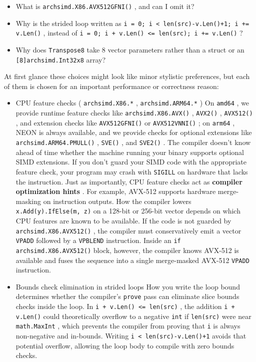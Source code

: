 \documentclass[11pt,a4paper]{article}
\begin{document}
\begin{itemize}
\item What is \texttt{archsimd.X86.AVX512GFNI()} , and can I omit it?
\item Why is the strided loop written as \texttt{i = 0; i < len(src)-v.Len()+1; i += v.Len()} , instead of \texttt{i = 0; i + v.Len() <= len(src); i += v.Len()} ?
\item Why does \texttt{Transpose8} take 8 vector parameters rather than a struct or an \texttt{[8]archsimd.Int32x8} array?
\end{itemize}

At first glance these choices might look like minor stylistic preferences, but each of them is chosen for an important performance or correctness reason:

\begin{itemize}
\item CPU feature checks ( \texttt{archsimd.X86.*} , \texttt{archsimd.ARM64.*} ) On \texttt{amd64} , we provide runtime feature checks like \texttt{archsimd.X86.AVX()} , \texttt{AVX2()} , \texttt{AVX512()} , and extension checks like \texttt{AVX512GFNI()} or \texttt{AVX512VNNI()} ; on \texttt{arm64} , NEON is always available, and we provide checks for optional extensions like \texttt{archsimd.ARM64.PMULL()} , \texttt{SVE()} , and \texttt{SVE2()} . The compiler doesn't know ahead of time whether the machine running your binary supports optional SIMD extensions. If you don't guard your SIMD code with the appropriate feature check, your program may crash with \texttt{SIGILL} on hardware that lacks the instruction. Just as importantly, CPU feature checks act as \textbf{compiler optimization hints} . For example, AVX-512 supports hardware merge-masking on instruction outputs. How the compiler lowers \texttt{x.Add(y).IfElse(m, z)} on a 128-bit or 256-bit vector depends on which CPU features are known to be available. If the code is not guarded by \texttt{archsimd.X86.AVX512()} , the compiler must conservatively emit a vector \texttt{VPADD} followed by a \texttt{VPBLEND} instruction. Inside an \texttt{if archsimd.X86.AVX512()} block, however, the compiler knows AVX-512 is available and fuses the sequence into a single merge-masked AVX-512 \texttt{VPADD} instruction.
\item Bounds check elimination in strided loops How you write the loop bound determines whether the compiler's \texttt{prove} pass can eliminate slice bounds checks inside the loop. In \texttt{i + v.Len() <= len(src)} , the addition \texttt{i + v.Len()} could theoretically overflow to a negative \texttt{int} if \texttt{len(src)} were near \texttt{math.MaxInt} , which prevents the compiler from proving that \texttt{i} is always non-negative and in-bounds. Writing \texttt{i < len(src)-v.Len()+1} avoids that potential overflow, allowing the loop body to compile with zero bounds checks.

\end{itemize}
\end{document}
